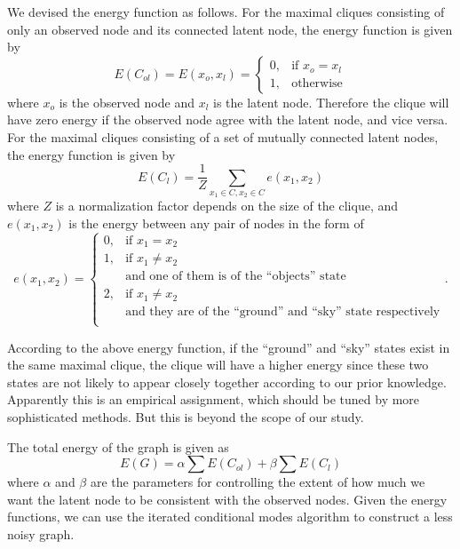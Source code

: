 We devised the energy function as follows. For the maximal cliques consisting of only an observed node and its connected latent node, the energy function is given by 
\begin{equation}
	E({C_{ol}}) = E({x_o},{x_l}) = 	
	\begin{cases}
    		0,& \text{if } x_o = x_l\\
    		1,              & \text{otherwise}
	\end{cases}
\end{equation}
where $x_o$ is the observed node and $x_l$ is the latent node. Therefore the clique will have zero energy if the observed node agree with the latent node, and vice versa. For the maximal cliques consisting of a set of mutually connected latent nodes, the energy function is given by 
\begin{equation}
	E({C_l}) =\frac{1}{Z} \sum\limits_{x_1\in C,x_2\in C}e(x_1,x_2)
\end{equation}
where $Z$ is a normalization factor depends on the size of the clique, and $e(x_1,x_2)$ is the energy between any pair of nodes in the form of
\begin{equation}
	e({x_1},{x_2}) = 	
	\begin{cases}
    		0,& \text{if } x_1 = x_2\\
    		1,& \text{if } x_1 \neq x_2\\
    		&\text{and one of them is of the ``objects'' state }\\
    		2,& \text{if } x_1 \neq x_2\\
    		&\text{and they are of the ``ground'' and ``sky'' state respectively}\\
	\end{cases}.
\end{equation}

According to the above energy function, if the ``ground'' and ``sky'' states exist in the same maximal clique, the clique will have a higher energy since these two states are not likely to appear closely together according to our prior knowledge. Apparently this is an empirical assignment, which should be tuned by more sophisticated methods. But this is beyond the scope of our study.

The total energy of the graph is given as 
\begin{equation}
	E({G}) =\alpha\sum\limits E({C_{ol}}) + \beta\sum\limits E({C_{l}}) 
\end{equation}
where $\alpha$ and $\beta$ are the parameters for controlling the extent of how much we want the latent node to be consistent with the observed nodes. Given the energy functions, we can use the iterated conditional modes algorithm to construct a less noisy graph.


